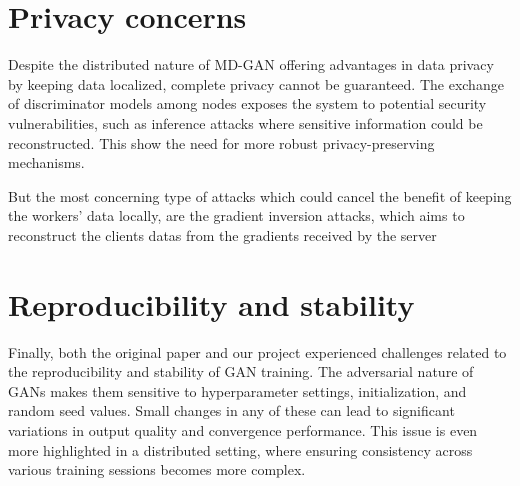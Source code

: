 \section{Privacy concerns}
Despite the distributed nature of MD-GAN offering advantages in data privacy by keeping data localized, complete privacy cannot be guaranteed. The exchange of discriminator models among nodes exposes the system to potential security vulnerabilities, such as inference attacks where sensitive information could be reconstructed. This show the need for more robust privacy-preserving mechanisms.

But the most concerning type of attacks which could cancel the benefit of keeping the workers' data locally, are the gradient inversion attacks, which aims to reconstruct the clients datas from the gradients received by the server

\section{Reproducibility and stability}
Finally, both the original paper and our project experienced challenges related to the reproducibility and stability of GAN training. The adversarial nature of GANs makes them sensitive to hyperparameter settings, initialization, and random seed values. Small changes in any of these can lead to significant variations in output quality and convergence performance. This issue is even more highlighted in a distributed setting, where ensuring consistency across various training sessions becomes more complex.